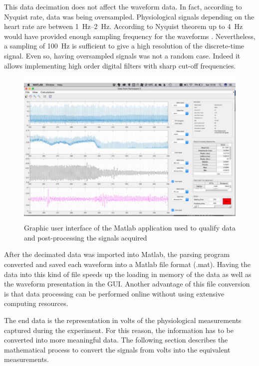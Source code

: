 This data decimation does not affect the waveform data. In fact, according to Nyquist rate, data was being oversampled. Physiological signals depending on the heart rate are between \SIrange{1}{2}{\hertz}. According to Nyquist theorem up to \SI{4}{\hertz} would have provided enough sampling frequency for the waveforms \cite{nyquist1928certain}. Nevertheless, a sampling of \SI{100}{\hertz} is sufficient to give a high resolution of the discrete-time signal. Even so, having oversampled signals was not a random case. Indeed it allows implementing high order digital filters with sharp cut-off frequencies. 

\begin{figure}[!htpb]
	\centering
	\includegraphics[width=15cm,keepaspectratio]{figure4}
	\caption[Graphic user interface of the Matlab application]{Graphic user interface of the Matlab application used to qualify data and post-processing the signals acquired}
	\label{fig:Matlalb Interface}
\end{figure}

After the decimated data was imported into Matlab, the parsing program converted and saved each waveform into a Matlab file format (.mat). Having the data into this kind of file speeds up the loading in memory of the data as well as the waveform presentation in the GUI. Another advantage of this file conversion is that data processing can be performed online without using extensive computing resources. 

The end data is the representation in volts of the physiological measurements captured during the experiment. For this reason, the information has to be converted into more meaningful data. The following section describes the mathematical process to convert the signals from volts into the equivalent measurements.

